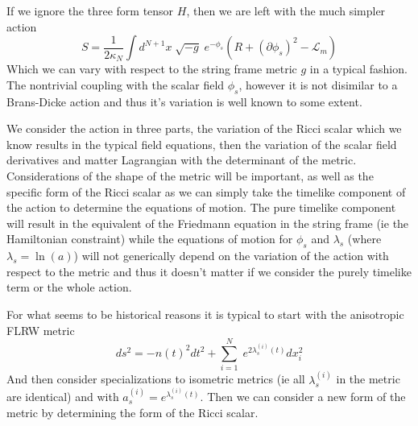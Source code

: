\documentclass[preprint]{ptephy_v1}
\begin{document}
    If we ignore the three form tensor $H$, then we are left with the much
    simpler action
    \begin{equation}
        S=\frac{1}{2\kappa_N} \int d^{N+1}x\;\sqrt{-g}\;e^{-\phi_s}\left(
        R+(\partial \phi_s)^2 - \mathcal{L}_m \right)
    \end{equation}
    Which we can vary with respect to the string frame metric $g$ in a typical
    fashion. The nontrivial coupling with the scalar field $\phi_s$, however it
    is not disimilar to a Brans-Dicke action and thus it's variation is well
    known to some extent.
    
    We consider the action in three parts, the variation of the Ricci scalar
    which we know results in the typical field equations, then the variation of
    the scalar field derivatives and matter Lagrangian with the determinant of
    the metric. Considerations of the shape of the metric will be important, as
    well as the specific form of the Ricci scalar as we can simply take the
    timelike component of the action to determine the equations of motion. The
    pure timelike component will result in the equivalent of the Friedmann
    equation in the string frame (ie the Hamiltonian constraint) while the
    equations of motion for $\phi_s$ and $\lambda_s$ (where $\lambda_s=\ln(a)$)
    will not generically depend on the variation of the action with respect to
    the metric and thus it doesn't matter if we consider the purely timelike
    term or the whole action.

    For what seems to be historical reasons it is typical to start with the
    anisotropic FLRW metric 
    \begin{equation}
        ds^2=-n(t)^2dt^2+\sum_{i=1}^N\;e^{2\lambda_s^{(i)}(t)}dx_i^2
    \end{equation}
    And then consider specializations to isometric metrics (ie all
    $\lambda_s^(i)$ in the metric are identical) and with
    $a_s^{(i)}=e^{\lambda_s^{(i)}(t)}$. Then we can consider a new form of the
    metric by determining the form of the Ricci scalar.

\end{document}
